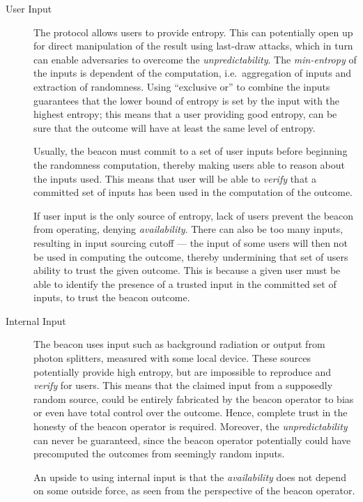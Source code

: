 \begin{description}
    \item[User Input]
        The protocol allows users to provide entropy.
        This can potentially open up for direct manipulation of the result using last-draw attacks, which in turn can enable adversaries to overcome the \emph{unpredictability}.
        The \emph{min-entropy} of the inputs is dependent of the computation, i.e.\ aggregation of inputs and extraction of randomness.
        Using \enquote{exclusive or} to combine the inputs guarantees that the lower bound of entropy is set by the input with the highest entropy;
        this means that a user providing good entropy, can be sure that the outcome will have at least the same level of entropy.

        Usually, the beacon must commit to a set of user inputs before beginning the randomness computation, thereby making users able to reason about the inputs used.
        This means that user will be able to \emph{verify} that a committed set of inputs has been used in the computation of the outcome.

        If user input is the only source of entropy, lack of users prevent the beacon from operating, denying \emph{availability}.
        There can also be too many inputs, resulting in input sourcing cutoff ---
        the input of some users will then not be used in computing the outcome, thereby undermining that set of users ability to trust the given outcome.
        This is because a given user must be able to identify the presence of a trusted input in the committed set of inputs, to trust the beacon outcome.

    \item[Internal Input]
        The beacon uses input such as background radiation or output from photon splitters, measured with some local device.
        These sources potentially provide high entropy, but are impossible to reproduce and \emph{verify} for users.
        This means that the claimed input from a supposedly random source, could be entirely fabricated by the beacon operator to bias or even have total control over the outcome.
        Hence, complete trust in the honesty of the beacon operator is required.
        Moreover, the \emph{unpredictability} can never be guaranteed, since the beacon operator potentially could have precomputed the outcomes from seemingly random inputs.

        An upside to using internal input is that the \emph{availability} does not depend on some outside force, as seen from the perspective of the beacon operator.


\end{description}
